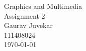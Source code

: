 \documentclass[a4paper,14pt,english,crop=false]{standalone}
\begin{document}
\begin{titlepage}
\begin{center}
  {Graphics and Multimedia \\}
  \LARGE{Assignment 2 \\}
  \horrule{0.4pt}
  \large{Gaurav Juvekar \\}
  \large{111408024 \\}
  \normalsize{\today{}}
\end{center}
\horrule{1pt}
\end{titlepage}
\end{document}
